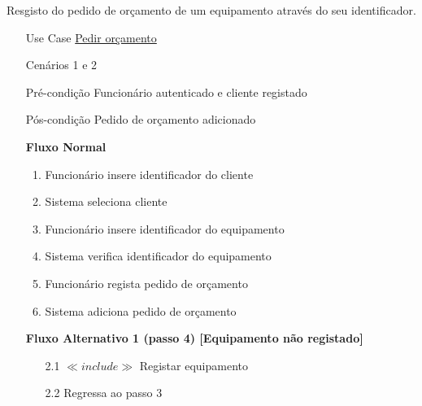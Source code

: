 \documentclass[../relatorio.tex]{subfiles}
\begin{document}
Resgisto do pedido de orçamento de um equipamento através do seu identificador.
\begin{itemize}
	\item[Use Case] {\underline{Pedir orçamento}}
	\item[Cenários] {1 e 2}
	\item[Pré-condição] {Funcionário autenticado e cliente registado}
	\item[Pós-condição] {Pedido de orçamento adicionado}
	      \begin{flushleft}
		      \textbf{Fluxo Normal}
	      \end{flushleft}
	      \begin{enumerate}
		      \item Funcionário insere identificador do cliente
              \item Sistema seleciona cliente
		      \item Funcionário insere identificador do equipamento
		      \item Sistema verifica identificador do equipamento
		      \item Funcionário regista pedido de orçamento
		      \item Sistema adiciona pedido de orçamento
	      \end{enumerate}

	      \begin{flushleft}
		      \textbf{Fluxo Alternativo 1 (passo 4) [Equipamento não registado]}
	      \end{flushleft}
	      \begin{itemize}
		      \item[2.1] $\ll include \gg$ Registar equipamento
		      \item[2.2] Regressa ao passo 3
	      \end{itemize}
\end{itemize}
\end{document}
